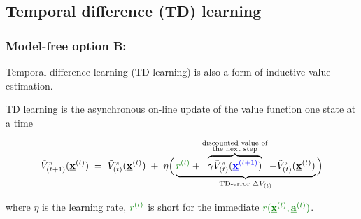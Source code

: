 \subsection{Temporal difference (TD) learning}

\begin{frame}\frametitle{Model-free option B:~\subsecname}

Temporal difference learning (TD learning) is also a form of inductive value estimation.


\pause 

\vspace{2mm}

TD learning is the asynchronous on-line update of the value function one state at a time
	\slidesonly{\vspace{-8mm}}
	
	\begin{equation}
		\tilde V^{\pi}_{(t+1)}(\vec x^{(t)}) \; = \; 
		\tilde V^{\pi}_{(t)}(\vec x^{(t)}) \;+\;
		\lr \Big( \underbrace{{\color{reward}r^{(t)}} 
		+ \overbrace{
		\gamma \tilde V^{\pi}_{(t)}({\color{trans}\vec x^{(t+1)}})
		}^{\substack{\text{discounted value of}\\ \text{the next step}}} 
		- \tilde V^{\pi}_{(t)}{(\vec x^{(t)})}}_{\text{TD-error }\Delta V_{(t)}} \Big) 
		\label{eq:tdlearningvalue}
	\end{equation}
	
	where $\eta$ is the learning rate, ${\color{reward}r^{(t)}}$ is short for the immediate ${\color{reward}r(\vec x^{(t)},\vec a^{(t)})}$.
	
\end{frame}
